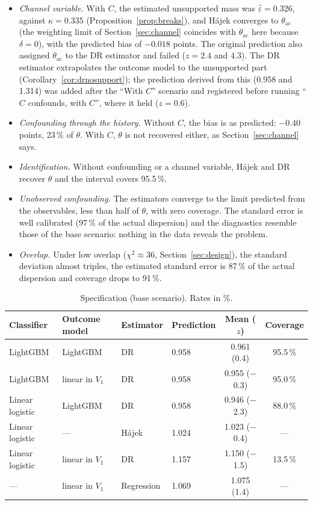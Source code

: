 \documentclass[11pt,a4paper]{article}
\newcommand{\thac}{\theta_{\mathrm{ac}}}
\theoremstyle{plain}
\theoremstyle{definition}
\begin{document}
\begin{itemize}
  \item \emph{Channel variable.} With $C$, the estimated unsupported mass was $\hat\varepsilon=0.326$, against $\kappa=0.335$ (Proposition~\ref{prop:breaks}), and Hájek converges to $\thac$ (the weighting limit of Section~\ref{sec:channel} coincides with $\thac$ here because $\delta=0$), with the predicted bias of $-0.018$ points. The original prediction also assigned $\thac$ to the DR estimator and failed ($z=2.4$ and $4.3$). The DR estimator extrapolates the outcome model to the unsupported part (Corollary~\ref{cor:drnosupport}); the prediction derived from this (0.958 and 1.314) was added after the ``With $C$'' scenario and registered before running ``$C$ confounds, with $C$'', where it held ($z=0.6$).
  \item \emph{Confounding through the history.} Without $C$, the bias is as predicted: $-0.40$ points, 23\,\% of $\theta$. With $C$, $\theta$ is not recovered either, as Section~\ref{sec:channel} says.
  \item \emph{Identification.} Without confounding or a channel variable, Hájek and DR recover $\theta$ and the interval covers 95.5\,\%.
  \item \emph{Unobserved confounding.} The estimators converge to the limit predicted from the observables, less than half of $\theta$, with zero coverage. The standard error is well calibrated (97\,\% of the actual dispersion) and the diagnostics resemble those of the base scenario: nothing in the data reveals the problem.
  \item \emph{Overlap.} Under low overlap ($\chi^2\approx36$, Section~\ref{sec:design}), the standard deviation almost triples, the estimated standard error is 87\,\% of the actual dispersion and coverage drops to 91\,\%.
\end{itemize}

\begin{table}[ht]
\centering\small
\caption{Specification (base scenario). Rates in \%.}\label{tab:specification}
\begin{tabular}{@{}llllcc@{}}
\toprule
Classifier & Outcome model & Estimator & Prediction & Mean ($z$) & Coverage \\
\midrule
LightGBM & LightGBM & DR & 0.958 & 0.961 (0.4) & 95.5\,\% \\
LightGBM & linear in $V_1$ & DR & 0.958 & 0.955 ($-$0.3) & 95.0\,\% \\
Linear logistic & LightGBM & DR & 0.958 & 0.946 ($-$2.3) & 88.0\,\% \\
Linear logistic & --- & Hájek & 1.024 & 1.023 ($-$0.4) & --- \\
Linear logistic & linear in $V_1$ & DR & 1.157 & 1.150 ($-$1.5) & 13.5\,\% \\
--- & linear in $V_1$ & Regression & 1.069 & 1.075 (1.4) & --- \\
\bottomrule
\end{tabular}
\end{table}
\end{document}
